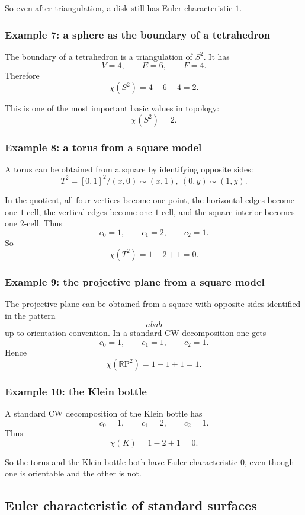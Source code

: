 \documentclass[12pt,a4paper]{article}
\newcommand{\RP}{\mathbb{R}\mathrm{P}}
\theoremstyle{notespace}
\begin{document}
So even after triangulation, a disk still has Euler characteristic \(1\).

\subsubsection*{Example 7: a sphere as the boundary of a tetrahedron}

The boundary of a tetrahedron is a triangulation of \(S^2\). It has
\[
V=4,\qquad E=6,\qquad F=4.
\]
Therefore
\[
\chi(S^2)=4-6+4=2.
\]

This is one of the most important basic values in topology:
\[
\chi(S^2)=2.
\]

\subsubsection*{Example 8: a torus from a square model}

A torus can be obtained from a square by identifying opposite sides:
\[
T^2=[0,1]^2/(x,0)\sim(x,1),\ (0,y)\sim(1,y).
\]

In the quotient, all four vertices become one point, the horizontal edges become one \(1\)-cell, the vertical edges become one \(1\)-cell, and the square interior becomes one \(2\)-cell. Thus
\[
c_0=1,\qquad c_1=2,\qquad c_2=1.
\]
So
\[
\chi(T^2)=1-2+1=0.
\]

\subsubsection*{Example 9: the projective plane from a square model}

The projective plane can be obtained from a square with opposite sides identified in the pattern
\[
aba b
\]
up to orientation convention. In a standard CW decomposition one gets
\[
c_0=1,\qquad c_1=1,\qquad c_2=1.
\]
Hence
\[
\chi(\RP^2)=1-1+1=1.
\]

\subsubsection*{Example 10: the Klein bottle}

A standard CW decomposition of the Klein bottle has
\[
c_0=1,\qquad c_1=2,\qquad c_2=1.
\]
Thus
\[
\chi(K)=1-2+1=0.
\]

So the torus and the Klein bottle both have Euler characteristic \(0\), even though one is orientable and the other is not.

\subsection{Euler characteristic of standard surfaces}
\end{document}
